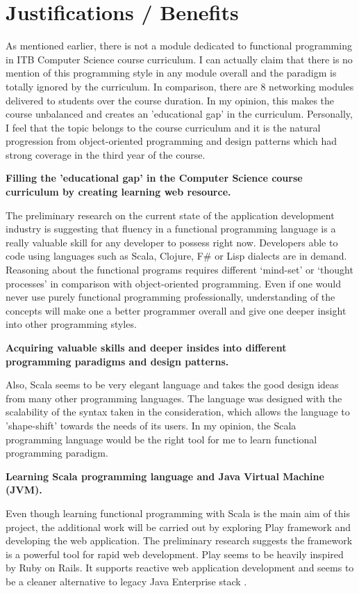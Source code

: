 \documentclass[12pt,twoside,a4paper]{report}
\begin{document}
\section{Justifications / Benefits}

As mentioned earlier, there is not a module dedicated to functional programming in ITB Computer Science course curriculum. I can actually claim that there is no mention of this programming style in any module overall and the paradigm is totally ignored by the curriculum. In comparison, there are 8 networking modules delivered to students over the course duration. In my opinion, this makes the course unbalanced and creates an 'educational gap' in the curriculum. Personally, I feel that the topic belongs to the course curriculum and it is the natural progression from object-oriented programming and design patterns which had strong coverage in the third year of the course.

\textbullet \textbf{ Filling the 'educational gap' in the Computer Science course curriculum by creating learning web resource.}
  
The preliminary research on the current state of the application development industry is suggesting that fluency in a functional programming language is a really valuable skill for any developer to possess right now. Developers able to code using languages such as Scala, Clojure, F\# or Lisp dialects are in demand. Reasoning about the functional programs requires different ‘mind-set’ or ‘thought processes’ in comparison with object-oriented programming. Even if one would never use purely functional programming professionally, understanding of the concepts will make one a better programmer overall and give one deeper insight into other programming styles.

\textbullet \textbf{ Acquiring valuable skills and deeper insides into different programming paradigms and design patterns.}

Also, Scala seems to be very elegant language and takes the good design ideas from many other programming languages. The language was designed with the scalability of the syntax taken in the consideration, which allows the language to 'shape-shift' towards the needs of its users. In my opinion, the Scala programming language would be the right tool for me to learn functional programming paradigm.

\textbullet \textbf{ Learning Scala programming language and Java Virtual Machine (JVM).}

Even though learning functional programming with Scala is the main aim of this project, the additional work will be carried out by exploring Play framework and developing the web application. The preliminary research suggests the framework is a powerful tool for rapid web development. Play seems to be heavily inspired by Ruby on Rails. It supports reactive web application development and seems to be a cleaner alternative to legacy Java Enterprise stack \cite{8}.
\end{document}
